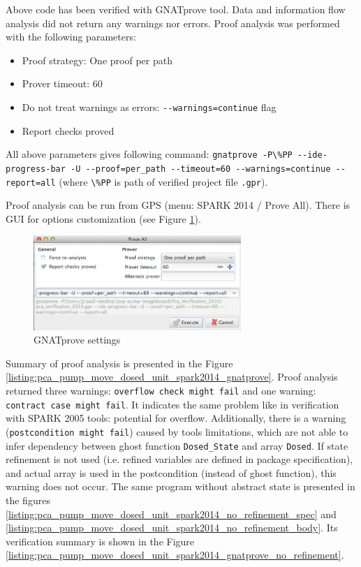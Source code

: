Above code has been verified with GNATprove tool. Data and information flow analysis did not return any warnings nor errors. Proof analysis was performed with the following parameters:
\begin{itemize}
    \item Proof strategy: One proof per path
    \item Prover timeout: 60
    \item Do not treat warnings as errors: \lstinline{--warnings=continue} flag
    \item Report checks proved
\end{itemize}

All above parameters gives following command: \lstinline{gnatprove -P\%PP --ide-progress-bar -U --proof=per_path --timeout=60 --warnings=continue --report=all} (where \lstinline{\%PP} is path of verified project file \lstinline{.gpr}).

Proof analysis can be run from GPS (menu: SPARK 2014 / Prove All). There is GUI for options customization (see Figure \ref{figure:gnatprove-settings}).

\begin{figure}[ht]%
    \begin{center}
        \includegraphics[width=0.7\textwidth]{figures/gnatprove-settings.png}        
    \end{center}
    \caption{GNATprove settings}
    \label{figure:gnatprove-settings}
\end{figure}

Summary of proof analysis is presented in the Figure \ref{listing:pca_pump_move_dosed_unit_spark2014_gnatprove}. Proof analysis returned three warnings: \lstinline{overflow check might fail} and one warning: \lstinline{contract case might fail}. It indicates the same problem like in verification with SPARK 2005 tools: potential for overflow. Additionally, there is a warning (\lstinline{postcondition might fail}) caused by tools limitations, which are not able to infer dependency between ghost function \lstinline{Dosed_State} and array \lstinline{Dosed}. If state refinement is not used (i.e. refined variables are defined in package specification), and actual array is used in the postcondition (instead of ghost function), this warning does not occur. The same program without abstract state is presented in the figures \ref{listing:pca_pump_move_dosed_unit_spark2014_no_refinement_spec} and \ref{listing:pca_pump_move_dosed_unit_spark2014_no_refinement_body}. Its verification summary is shown in the Figure \ref{listing:pca_pump_move_dosed_unit_spark2014_gnatprove_no_refinement}. 

